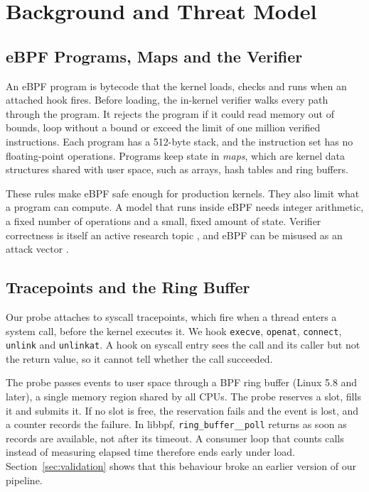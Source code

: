 \section{Background and Threat Model}
\label{sec:background}

\subsection{eBPF Programs, Maps and the Verifier}

An eBPF program is bytecode that the kernel loads, checks and runs when an attached hook fires. Before loading, the in-kernel verifier walks every path through the program. It rejects the program if it could read memory out of bounds, loop without a bound or exceed the limit of one million verified instructions. Each program has a 512-byte stack, and the instruction set has no floating-point operations. Programs keep state in \emph{maps}, which are kernel data structures shared with user space, such as arrays, hash tables and ring buffers.

These rules make eBPF safe enough for production kernels. They also limit what a program can compute. A model that runs inside eBPF needs integer arithmetic, a fixed number of operations and a small, fixed amount of state. Verifier correctness is itself an active research topic \parencite{R043}, and eBPF can be misused as an attack vector \parencite{P039,R041,R042}.

\subsection{Tracepoints and the Ring Buffer}

Our probe attaches to syscall tracepoints, which fire when a thread enters a system call, before the kernel executes it. We hook \texttt{execve}, \texttt{openat}, \texttt{connect}, \texttt{unlink} and \texttt{unlinkat}. A hook on syscall entry sees the call and its caller but not the return value, so it cannot tell whether the call succeeded.

The probe passes events to user space through a BPF ring buffer (Linux 5.8 and later), a single memory region shared by all CPUs. The probe reserves a slot, fills it and submits it. If no slot is free, the reservation fails and the event is lost, and a counter records the failure. In libbpf, \texttt{ring\_buffer\_\_poll} returns as soon as records are available, not after its timeout. A consumer loop that counts calls instead of measuring elapsed time therefore ends early under load. Section~\ref{sec:validation} shows that this behaviour broke an earlier version of our pipeline.

